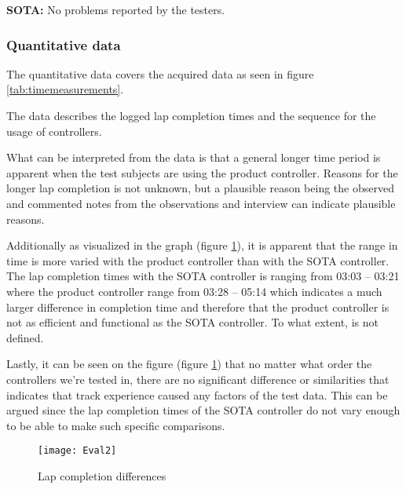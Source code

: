 \noindent\textbf{SOTA:}\newline
No problems reported by the testers.


\subsubsection{Quantitative data}
The quantitative data covers the acquired data as seen in figure \ref{tab:timemeasurements}.
\bigskip

The data describes the logged lap completion times and the sequence for the usage of controllers.
\bigskip

What can be interpreted from the data is that a general longer time period is apparent when the test subjects are using the product controller. 
Reasons for the longer lap completion is not unknown, but a plausible reason being the observed and commented notes from the observations and interview can indicate plausible reasons.
\bigskip

Additionally as visualized in the graph (figure \ref{fig:timechart}), it is apparent that the range in time is more varied with the product controller than with the SOTA controller. The lap completion times with the SOTA controller is ranging from 03:03 – 03:21 where the product controller range from 03:28 – 05:14 which indicates a much larger difference in completion time and therefore that the product controller is not as efficient and functional as the SOTA controller. To what extent, is not defined. 
\bigskip

Lastly, it can be seen on the figure (figure \ref{fig:timechart}) that no matter what order the controllers we’re tested in, there are no significant difference or similarities that indicates that track experience caused any factors of the test data. This can be argued since the lap completion times of the SOTA controller do not vary enough to be able to make such specific comparisons.


\begin{figure}[!htbp]
\centering
\texttt{[image: Eval2]}
\caption{Lap completion differences} \label{fig:timechart}
\end{figure}